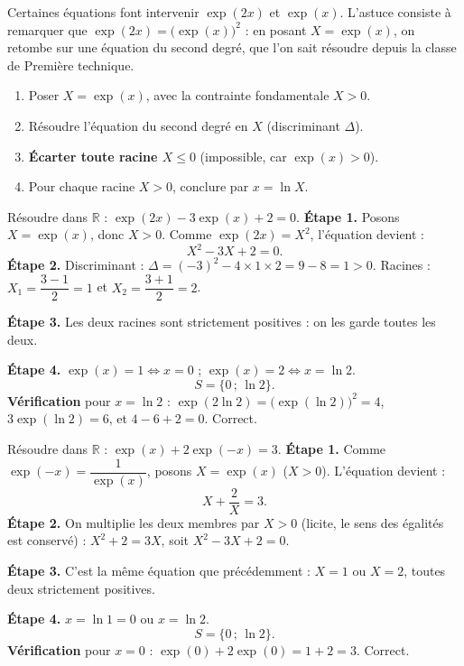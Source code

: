 \documentclass[11pt]{article}
\newcounter{popsec}
\newcounter{popsub}
\newcommand{\courssub}[1]{%
  \stepcounter{popsub}%
  \par\vspace{9pt}\noindent{\popxbold\fontsize{11.5}{13}\selectfont\color{popink}{\color{poporange}\thepopsec.\thepopsub}\hspace{6pt}#1}\par\nopagebreak\vspace{4pt}
}
\begin{document}
\courssub{Changement de variable $X = \exp(x)$}

Certaines équations font intervenir $\exp(2x)$ et $\exp(x)$. L'astuce consiste à remarquer que $\exp(2x) = \bigl(\exp(x)\bigr)^2$ : en posant $X = \exp(x)$, on retombe sur une équation du second degré, que l'on sait résoudre depuis la classe de Première technique.

\begin{methode}
\begin{enumerate}
\item Poser $X = \exp(x)$, avec la contrainte fondamentale $X > 0$.
\item Résoudre l'équation du second degré en $X$ (discriminant $\Delta$).
\item \textbf{Écarter toute racine $X \leq 0$} (impossible, car $\exp(x) > 0$).
\item Pour chaque racine $X > 0$, conclure par $x = \ln X$.
\end{enumerate}
\end{methode}

\begin{exoresolu}[Résoudre $\exp(2x) - 3\exp(x) + 2 = 0$]
Résoudre dans $\mathbb{R}$ : $\exp(2x) - 3\exp(x) + 2 = 0$.
\tcblower
\textbf{Étape 1.} Posons $X = \exp(x)$, donc $X > 0$. Comme $\exp(2x) = X^2$, l'équation devient :
\[
X^2 - 3X + 2 = 0.
\]
\textbf{Étape 2.} Discriminant : $\Delta = (-3)^2 - 4\times 1\times 2 = 9 - 8 = 1 > 0$. Racines : $X_1 = \dfrac{3-1}{2} = 1$ et $X_2 = \dfrac{3+1}{2} = 2$.

\textbf{Étape 3.} Les deux racines sont strictement positives : on les garde toutes les deux.

\textbf{Étape 4.} $\exp(x) = 1 \iff x = 0$ ; $\exp(x) = 2 \iff x = \ln 2$.
\[
S = \{0 \,;\, \ln 2\}.
\]
\textbf{Vérification} pour $x = \ln 2$ : $\exp(2\ln 2) = \bigl(\exp(\ln 2)\bigr)^2 = 4$, $3\exp(\ln 2) = 6$, et $4 - 6 + 2 = 0$. Correct.
\end{exoresolu}

\begin{exoresolu}[Résoudre $\exp(x) + 2\exp(-x) = 3$]
Résoudre dans $\mathbb{R}$ : $\exp(x) + 2\exp(-x) = 3$.
\tcblower
\textbf{Étape 1.} Comme $\exp(-x) = \dfrac{1}{\exp(x)}$, posons $X = \exp(x)$ ($X > 0$). L'équation devient :
\[
X + \frac{2}{X} = 3.
\]
\textbf{Étape 2.} On multiplie les deux membres par $X > 0$ (licite, le sens des égalités est conservé) : $X^2 + 2 = 3X$, soit $X^2 - 3X + 2 = 0$.

\textbf{Étape 3.} C'est la même équation que précédemment : $X = 1$ ou $X = 2$, toutes deux strictement positives.

\textbf{Étape 4.} $x = \ln 1 = 0$ ou $x = \ln 2$.
\[
S = \{0 \,;\, \ln 2\}.
\]
\textbf{Vérification} pour $x = 0$ : $\exp(0) + 2\exp(0) = 1 + 2 = 3$. Correct.
\end{exoresolu}
\end{document}
